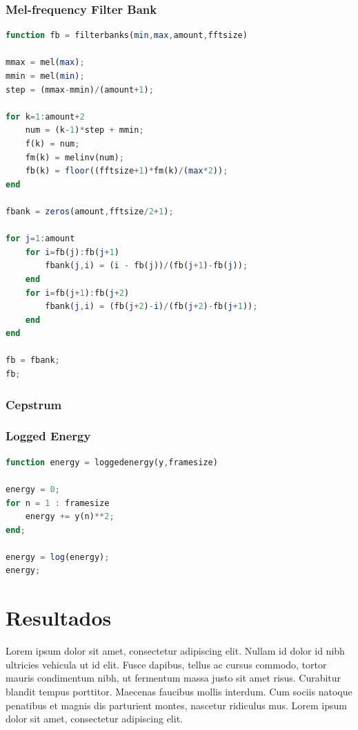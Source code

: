 \documentclass[a4paper,10pt]{article}
\begin{document}
\subsubsection{Mel-frequency Filter Bank}

\begin{lstlisting}[language=Octave, caption = filterbanks]
function fb = filterbanks(min,max,amount,fftsize)

mmax = mel(max);
mmin = mel(min);
step = (mmax-mmin)/(amount+1);

for k=1:amount+2
	num = (k-1)*step + mmin;
	f(k) = num;
	fm(k) = melinv(num);
	fb(k) = floor((fftsize+1)*fm(k)/(max*2));
end

fbank = zeros(amount,fftsize/2+1);

for j=1:amount
	for i=fb(j):fb(j+1)
		fbank(j,i) = (i - fb(j))/(fb(j+1)-fb(j));
	end
	for i=fb(j+1):fb(j+2)
		fbank(j,i) = (fb(j+2)-i)/(fb(j+2)-fb(j+1));
	end
end

fb = fbank;
fb;
\end{lstlisting}

\subsubsection{Cepstrum}


\subsubsection{Logged Energy}

\begin{lstlisting}[language=Octave, caption = Logged Energy]
function energy = loggedenergy(y,framesize)

energy = 0;
for n = 1 : framesize
	energy += y(n)**2;
end;

energy = log(energy);	
energy;
\end{lstlisting}

\section{Resultados}
Lorem ipsum dolor sit amet, consectetur adipiscing elit. Nullam id dolor id nibh ultricies vehicula ut id elit. Fusce dapibus, tellus ac cursus commodo, tortor mauris condimentum nibh, ut fermentum massa justo sit amet risus. Curabitur blandit tempus porttitor. Maecenas faucibus mollis interdum. Cum sociis natoque penatibus et magnis dis parturient montes, nascetur ridiculus mus. Lorem ipsum dolor sit amet, consectetur adipiscing elit.
\newline
\end{document}
